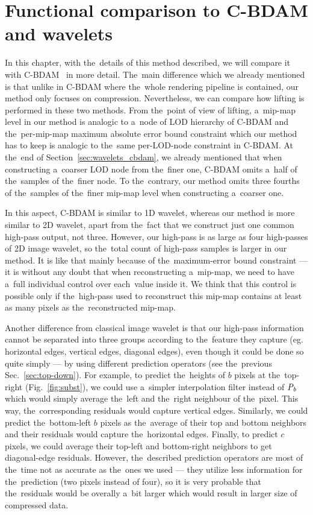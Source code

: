 \chapter{Functional comparison to C-BDAM and wavelets}\label{chap:cbdam_comp}

In this chapter, with the~details of this method described, we will compare it with C-BDAM~\cite{cbdam} in more detail. The~main difference which we already mentioned is that unlike in C-BDAM where the~whole rendering pipeline is contained, our method only focuses on compression. Nevertheless, we can compare how lifting is performed in these two methods. From the~point of view of lifting, a~mip-map level in our method is analogic to a~node of LOD hierarchy of C-BDAM and the~per-mip-map maximum absolute error bound constraint which our method has to keep is analogic to the~same per-LOD-node constraint in C-BDAM. At the~end of Section~\ref{sec:wavelets_cbdam}, we already mentioned that when constructing a~coarser LOD node from the~finer one, C-BDAM omits a~half of the~samples of the~finer node. To the~contrary, our method omits three fourths of the~samples of the~finer mip-map level when constructing a~coarser one. 

In this aspect, C-BDAM is similar to 1D wavelet, whereas our method is more similar to 2D wavelet, apart from the~fact that we construct just one common high-pass output, not three. However, our high-pass is as large as four high-passes of 2D image wavelet, so the~total count of high-pass samples is larger in our method. It is like that mainly because of the~maximum-error bound constraint --- it is without any doubt that when reconstructing a~mip-map, we need to have a~full individual control over each~value inside it. We think that this control is possible only if the~high-pass used to reconstruct this mip-map contains at least as many pixels as the~reconstructed mip-map.

Another difference from classical image wavelet is that our high-pass information cannot be separated into three groups according to the~feature they capture (eg. horizontal edges, vertical edges, diagonal edges), even though it could be done so quite simply --- by using different prediction operators (see the~previous Sec.~\ref{sec:top-down}). For example, to predict the~heights of $b$ pixels at the~top-right (Fig.~\ref{fig:subst}), we could use a~simpler interpolation filter instead of $\mathit{P_{b}}$ which would simply average the~left and the~right neighbour of the~pixel. This way, the~corresponding residuals would capture vertical edges. Similarly, we could predict the~bottom-left $b$ pixels as the~average of their top and bottom neighbors and their residuals would capture the~horizontal edges. Finally, to predict $c$ pixels, we could average their top-left and bottom-right neighbors to get diagonal-edge residuals. However, the~described prediction operators are most of the~time not as accurate as the~ones we used --- they utilize less information for the~prediction (two pixels instead of four), so it is very probable that the~residuals would be overally a~bit larger which would result in larger size of compressed data.

